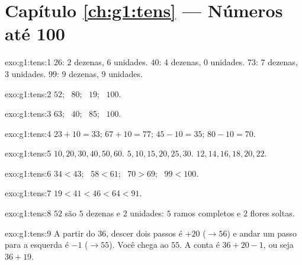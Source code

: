 \section*{Capítulo \ref{ch:g1:tens} --- Números até 100}

\begin{solution}{exo:g1:tens:1}
$26$: $2$ dezenas, $6$ unidades. $40$: $4$ dezenas, $0$ unidades.
$73$: $7$ dezenas, $3$ unidades. $99$: $9$ dezenas, $9$ unidades.
\end{solution}

\begin{solution}{exo:g1:tens:2}
$52$; \ $80$; \ $19$; \ $100$.
\end{solution}

\begin{solution}{exo:g1:tens:3}
$63$; \ $40$; \ $85$; \ $100$.
\end{solution}

\begin{solution}{exo:g1:tens:4}
$23 + 10 = 33$; \quad $67 + 10 = 77$; \quad $45 - 10 = 35$; \quad
$80 - 10 = 70$.
\end{solution}

\begin{solution}{exo:g1:tens:5}
$10, 20, 30, 40, 50, 60$. \quad $5, 10, 15, 20, 25, 30$. \quad
$12, 14, 16, 18, 20, 22$.
\end{solution}

\begin{solution}{exo:g1:tens:6}
$34 < 43$; \ $58 < 61$; \ $70 > 69$; \ $99 < 100$.
\end{solution}

\begin{solution}{exo:g1:tens:7}
$19 < 41 < 46 < 64 < 91$.
\end{solution}

\begin{solution}{exo:g1:tens:8}
$52$ são $5$ dezenas e $2$ unidades: $5$ ramos completos e $2$
flores soltas.
\end{solution}

\begin{solution}{exo:g1:tens:9}
A partir do $36$, descer dois passos é $+20$ ($\to 56$) e andar um
passo para a esquerda é $-1$ ($\to 55$). Você chega ao $55$. A conta
é $36 + 20 - 1$, ou seja $36 + 19$.
\end{solution}
